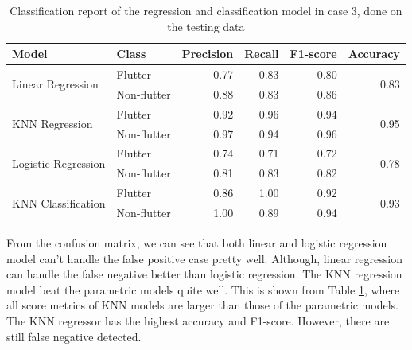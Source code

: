 \documentclass[conf]{new-aiaa}
\begin{document}
\begin{table}[H]
    \centering
    \caption{\label{tab:case3_classification_report}Classification report of the regression and classification model in case 3, done on the testing data}
    \begin{tabular}{llrrrr}
        \toprule
        Model                               & Class         &  Precision    &  Recall       &  F1-score     & Accuracy \\
        \midrule
        \multirow{2}{*}{Linear Regression}  & Flutter       &  0.77         &  0.83         &  0.80         &  \multirow{2}{*}{0.83} \\
                                            & Non-flutter   &  0.88         &  0.83         &  0.86         &   \\
        \midrule
        \multirow{2}{*}{KNN Regression}     & Flutter       &  0.92         &  0.96         &  0.94         &  \multirow{2}{*}{0.95} \\
                                            & Non-flutter   &  0.97         &  0.94         &  0.96         &   \\
        \midrule
        \multirow{2}{*}{Logistic Regression} & Flutter       &  0.74         &  0.71         &  0.72         &  \multirow{2}{*}{0.78} \\
                                            & Non-flutter   &  0.81         &  0.83         &  0.82         &   \\
        \midrule
        \multirow{2}{*}{KNN Classification} & Flutter       &  0.86         &  1.00         &  0.92         &  \multirow{2}{*}{0.93} \\
                                            & Non-flutter   &  1.00         &  0.89         &  0.94         &   \\
        \bottomrule
    \end{tabular}
\end{table}

From the confusion matrix, we can see that both linear and logistic regression model can't handle the false positive case pretty well. Although, linear regression can handle the false negative better than logistic regression. The KNN regression model beat the parametric models quite well. This is shown from Table \ref{tab:case3_classification_report}, where all score metrics of KNN models are larger than those of the parametric models. The KNN regressor has the highest accuracy and F1-score. However, there are still false negative detected. 
\end{document}
